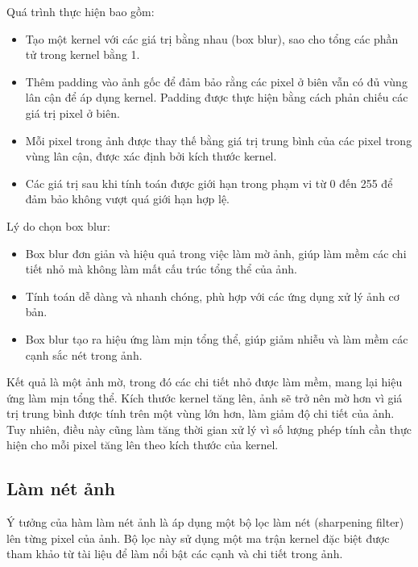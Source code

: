Quá trình thực hiện bao gồm:
\begin{itemize}
	\item Tạo một kernel với các giá trị bằng nhau (box blur), sao cho tổng các phần tử trong kernel bằng 1.
	\item Thêm padding vào ảnh gốc để đảm bảo rằng các pixel ở biên vẫn có đủ vùng lân cận để áp dụng kernel. Padding được thực hiện bằng cách phản chiếu các giá trị pixel ở biên.

	\item Mỗi pixel trong ảnh được thay thế bằng giá trị trung bình của các pixel trong vùng lân cận, được xác định bởi kích thước kernel.
	\item Các giá trị sau khi tính toán được giới hạn trong phạm vi từ 0 đến 255 để đảm bảo không vượt quá giới hạn hợp lệ.
\end{itemize}

Lý do chọn box blur:
\begin{itemize}
	\item Box blur đơn giản và hiệu quả trong việc làm mờ ảnh, giúp làm mềm các chi tiết nhỏ mà không làm mất cấu trúc tổng thể của ảnh.
	\item Tính toán dễ dàng và nhanh chóng, phù hợp với các ứng dụng xử lý ảnh cơ bản.
	\item Box blur tạo ra hiệu ứng làm mịn tổng thể, giúp giảm nhiễu và làm mềm các cạnh sắc nét trong ảnh.
\end{itemize}

Kết quả là một ảnh mờ, trong đó các chi tiết nhỏ được làm mềm, mang lại hiệu ứng làm mịn tổng thể. Kích thước kernel tăng lên, ảnh sẽ trở nên mờ hơn vì giá trị trung bình được tính trên một vùng lớn hơn, làm giảm độ chi tiết của ảnh. Tuy nhiên, điều này cũng làm tăng thời gian xử lý vì số lượng phép tính cần thực hiện cho mỗi pixel tăng lên theo kích thước của kernel.

\subsection{Làm nét ảnh}
Ý tưởng của hàm làm nét ảnh là áp dụng một bộ lọc làm nét (sharpening filter) lên từng pixel của ảnh. Bộ lọc này sử dụng một ma trận kernel đặc biệt được tham khảo từ tài liệu \cite{geeksforgeeks_convolution_kernels} để làm nổi bật các cạnh và chi tiết trong ảnh.

